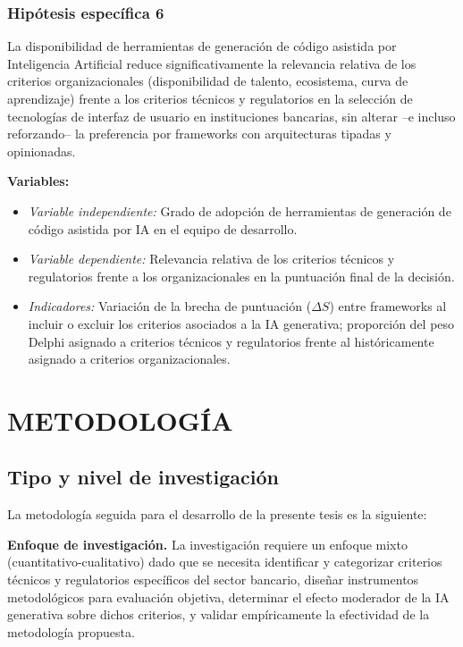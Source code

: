 \subsubsection{Hipótesis específica 6}

La disponibilidad de herramientas de generación de código asistida
        por Inteligencia Artificial reduce significativamente la relevancia
        relativa de los criterios organizacionales (disponibilidad de talento,
        ecosistema, curva de aprendizaje) frente a los criterios técnicos y
        regulatorios en la selección de tecnologías de interfaz de usuario en
        instituciones bancarias, sin alterar --e incluso reforzando-- la
        preferencia por frameworks con arquitecturas tipadas y opinionadas.

        \textbf{Variables:}
        \begin{itemize}
          \item \textit{Variable independiente:} Grado de adopción de
                herramientas de generación de código asistida por IA en el
                equipo de desarrollo.
          \item \textit{Variable dependiente:} Relevancia relativa de los
                criterios técnicos y regulatorios frente a los organizacionales
                en la puntuación final de la decisión.
          \item \textit{Indicadores:} Variación de la brecha de puntuación
                ($\Delta S$) entre frameworks al incluir o excluir los criterios
                asociados a la IA generativa; proporción del peso Delphi
                asignado a criterios técnicos y regulatorios frente al
                históricamente asignado a criterios organizacionales.
        \end{itemize}

\section{METODOLOGÍA}

\subsection{Tipo y nivel de investigación}

La metodología seguida para el desarrollo de la presente tesis es la siguiente:

\textbf{Enfoque de investigación.} La investigación requiere un enfoque
        mixto (cuantitativo-cualitativo) dado que se necesita identificar y
        categorizar criterios técnicos y regulatorios específicos del sector
        bancario, diseñar instrumentos metodológicos para evaluación objetiva,
        determinar el efecto moderador de la IA generativa sobre dichos
        criterios, y validar empíricamente la efectividad de la metodología
        propuesta.



